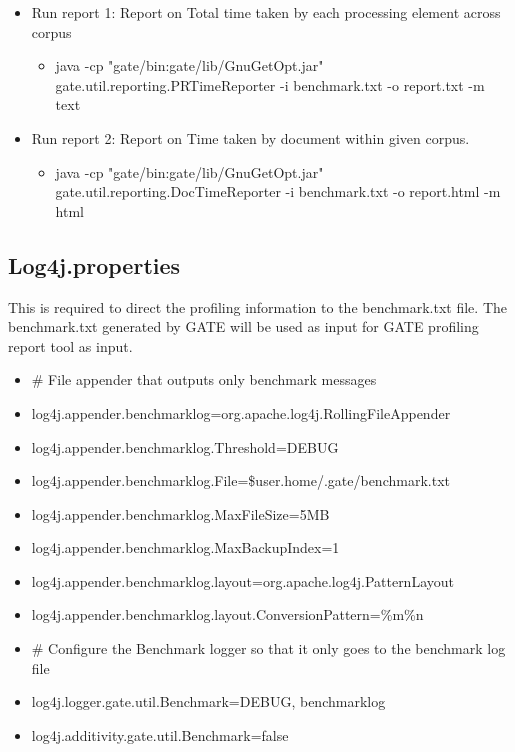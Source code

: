 \begin{itemize}
  \item Run report 1: Report on 
  Total time taken by each processing element across corpus
  \begin{itemize}
    \item java -cp "gate/bin:gate/lib/GnuGetOpt.jar" 
    gate.util.reporting.PRTimeReporter -i benchmark.txt 
    -o report.txt -m text
  \end{itemize}
  \item Run report 2: Report on Time 
  taken by document within given corpus.
  \begin{itemize}
    \item java -cp "gate/bin:gate/lib/GnuGetOpt.jar" 
    gate.util.reporting.DocTimeReporter -i benchmark.txt
    -o report.html -m html
  \end{itemize}
\end{itemize}


\subsection{Log4j.properties}

This is required to direct the profiling information to the benchmark.txt
file. The benchmark.txt generated by GATE will be used as input for GATE
profiling report tool as input.

\begin{itemize}
  \item \# File appender that outputs only benchmark messages
  \item log4j.appender.benchmarklog=org.apache.log4j.RollingFileAppender
  \item log4j.appender.benchmarklog.Threshold=DEBUG
  \item log4j.appender.benchmarklog.File=\${user.home}/.gate/benchmark.txt
  \item log4j.appender.benchmarklog.MaxFileSize=5MB
  \item log4j.appender.benchmarklog.MaxBackupIndex=1
  \item log4j.appender.benchmarklog.layout=org.apache.log4j.PatternLayout
  \item log4j.appender.benchmarklog.layout.ConversionPattern=\%m\%n
  \item \# Configure the Benchmark logger so that it only goes to the
  benchmark log file
  \item log4j.logger.gate.util.Benchmark=DEBUG, benchmarklog
  \item log4j.additivity.gate.util.Benchmark=false
\end{itemize}


